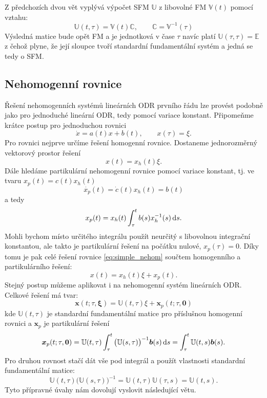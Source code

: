 \documentclass[a4paper, 12pt]{book}
\theoremstyle{definition}
\def\d{\,{\rm d}}               %
\def\vc#1{\mathbf{\boldsymbol{#1}}}     %
\def\tn#1{{\mathbb{#1}}}    %
\begin{document}
Z předchozích dvou vět vyplývá výpočet SFM  $\tn U$ z libovolné FM $\tn V(t)$ pomocí vztahu:
\[
    \tn U(t, \tau) = \tn V(t) \tn C,\qquad \tn C = \tn V^{-1}(\tau)
\]
Výsledná matice bude opět FM a je jednotková v čase $\tau$ navíc platí $\tn U(\tau,\tau) = \tn E$ z čehož plyne, 
že její sloupce tvoří standardní fundamentální systém a jedná se tedy o SFM.


\subsection{Nehomogenní rovnice}
Řešení nehomogenních systémů lineárních ODR prvního řádu lze provést podobně jako pro jednoduché 
lineární ODR, tedy pomocí variace konstant. Připomeňme krátce postup pro jednoduchou rovnici
\[
  \dot{x} = a(t)x + b(t), \qquad x(\tau) = \xi.
\]
Pro rovnici nejprve určíme řešení homogenní rovnice. Dostaneme jednorozměrný vektorový prostor řešení
\[
   x(t) = x_h(t) \xi. 
\]
Dále hledáme partikulární nehomogenní rovnice pomocí variace konstant, tj. ve tvaru $x_p(t) = c(t) x_h(t)$
\[
   \dot{ x_p }(t) = \dot{c}(t) x_h(t) = b(t)
\]
a tedy
\[
   x_p(t) = x_h(t) \int_\tau^t b(s) x_h^{-1} (s) \d s.
\]   
Mohli bychom místo určitého integrálu použít neurčitý s libovolnou integrační konstantou, 
ale takto je partikulární řešení na počátku nulové, $x_p(\tau) = 0$. Díky tomu je pak celé řešení rovnice \eqref{eq:simple_nehom}
součtem homogenního a partikulárního řešení:
\[
   x(t) = x_h(t) \xi + x_p(t).
\]
Stejný postup můžeme aplikovat i na nehomogenní systém lineárních ODR. Celkové řešení má tvar:
\[
   \vc x(t; \tau, \vc \xi) = \tn U(t, \tau) \xi + \vc x_p(t; \tau, \vc 0)
\]
kde $\tn U(t,\tau)$ je standardní fundamentální matice pro příslušnou homogenní rovnici a  $\vc x_p$ je partikulární řešení 
\[
   \vc x_p(t; \tau, \vc 0) = \tn U(t, \tau) \int_\tau^t \big( \tn U(s,\tau)\big)^{-1} \vc b(s) \d s = 
   \int_\tau^t \tn U(t, s) \vc b(s).
\]
Pro druhou rovnost stačí dát vše pod integrál a použít vlastnosti standardní fundamentální matice:
\[
   \tn U(t, \tau) \big(\tn U(s,\tau) \big)^{-1} = \tn U(t,\tau) \tn U(\tau,s) = \tn U(t,s).
\]
Tyto přípravné úvahy nám dovolují vyslovit následující větu.
\end{document}
